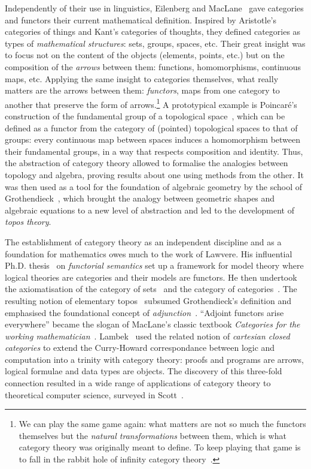Independently of their use in linguistics, Eilenberg and MacLane~\cite{EilenbergMacLane42,EilenbergMacLane42a,EilenbergMacLane45} gave categories and functors their current mathematical definition.
Inspired by Aristotle's categories of things and Kant's categories of thoughts, they defined categories as types of \emph{mathematical structures}: sets, groups, spaces, etc.
Their great insight was to focus not on the content of the objects (elements, points, etc.) but on the composition of the \emph{arrows} between them: functions, homomorphisms, continuous maps, etc.
Applying the same insight to categories themselves, what really matters are the arrows between them: \emph{functors}, maps from one category to another that preserve the form of arrows.\footnote
{We can play the same game again: what matters are not so much the functors themselves but the \emph{natural transformations} between them, which is what category theory was originally meant to define.
To keep playing that game is to fall in the rabbit hole of infinity category theory~\cite{RiehlVerity16}.}
A prototypical example is Poincaré's construction of the fundamental group of a topological space~\cite{Poincare95}, which can be defined as a functor from the category of (pointed) topological spaces to that of groups: every continuous map between spaces induces a homomorphism between their fundamental groups, in a way that respects composition and identity.
Thus, the abstraction of category theory allowed to formalise the analogies between topology and algebra, proving results about one using methods from the other.
It was then used as a tool for the foundation of algebraic geometry by the school of Grothendieck~\cite{GrothendieckDieudonne60}, which brought the analogy between geometric shapes and algebraic equations to a new level of abstraction and led to the development of \emph{topos theory}.

The establishment of category theory as an independent discipline and as a foundation for mathematics owes much to the work of Lawvere.
His influential Ph.D. thesis~\cite{Lawvere63} on \emph{functorial semantics} set up a framework for model theory where logical theories are categories and their models are functors.
He then undertook the axiomatisation of the category of sets~\cite{Lawvere64} and the category of categories~\cite{Lawvere66}.
The resulting notion of elementary topos~\cite{Lawvere70a} subsumed Grothendieck's definition and emphasised the foundational concept of \emph{adjunction}~\cite{Lawvere69a,Lawvere70}.
``Adjoint functors arise everywhere'' became the slogan of MacLane's classic textbook \emph{Categories for the working mathematician}~\cite{MacLane71}.
Lambek~\cite{Lambek68,Lambek69,Lambek72} used the related notion of \emph{cartesian closed categories} to extend the Curry-Howard correspondance between logic and computation into a trinity with category theory: proofs and programs are arrows, logical formulae and data types are objects.
The discovery of this three-fold connection resulted in a wide range of applications of category theory to theoretical computer science, surveyed in Scott~\cite{Scott00}.


